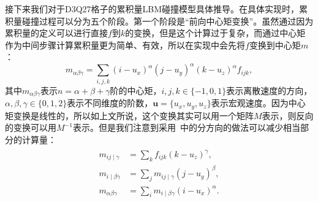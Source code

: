 接下来我们对于D3Q27格子的累积量LBM碰撞模型具体推导。在具体实现时，累积量碰撞过程可以分为五个阶段。第一个阶段是“前向中心矩变换”。虽然通过因为累积量的定义可以进行直接$f$到$k$的变换，但是这个计算过于复杂，而通过中心矩作为中间步骤计算累积量更为简单、有效，所以在实现中会先将$f$变换到中心矩$m$：
\begin{equation}
m_{\alpha \beta \gamma} =\sum_{i,j,k} (i-u_x)^{\alpha} (j-u_y)^{\alpha} (k-u_z)^{\alpha} f_{ijk},
\end{equation}
其中$m_{\alpha \beta \gamma}$表示$n=\alpha+\beta+\gamma$阶的中心矩，$i, j, k \in \{-1, 0, 1\}$表示离散速度的方向，$\alpha, \beta, \gamma \in \{0, 1, 2\}$表示不同维度的阶数，$\boldsymbol{u}=\{u_x, u_y, u_z\}$表示宏观速度。因为中心矩变换是线性的，所以如上文所说，这个变换其实可以用一个矩阵$M$表示，则反向的变换可以用$M^{-1}$表示。但是我们注意到采用~\cite{Geier-2015}中的分方向的做法可以减少相当部分的计算量：
\begin{align}
    \begin{split}
m_{i j \mid \gamma} & =\sum_{k} f_{ijk}(k-u_z)^{\gamma}, \\
m_{i \mid \beta \gamma} & =\sum_{j} m_{i j \mid \gamma}(j-u_y)^{\beta}, \\
m_{\alpha \beta \gamma} & =\sum_{i} m_{i \mid \beta \gamma}(i-u_x)^{\alpha}.
\end{split}
\end{align}

